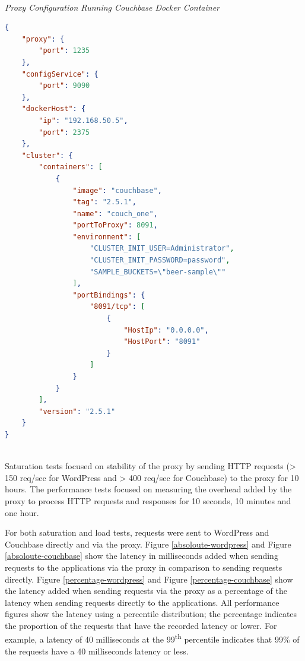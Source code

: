 \documentclass[a4paper,11pt,twoside]{report}
\begin{document}
\noindent\\
\textit{Proxy Configuration Running Couchbase Docker Container}
\begin{lstlisting}[language=json]
{
    "proxy": {
        "port": 1235
    },
    "configService": {
        "port": 9090
    },
    "dockerHost": {
        "ip": "192.168.50.5",
        "port": 2375
    },
    "cluster": {
        "containers": [
            {
                "image": "couchbase",
                "tag": "2.5.1",
                "name": "couch_one",
                "portToProxy": 8091,
                "environment": [
                    "CLUSTER_INIT_USER=Administrator",
                    "CLUSTER_INIT_PASSWORD=password",
                    "SAMPLE_BUCKETS=\"beer-sample\""
                ],
                "portBindings": {
                    "8091/tcp": [
                        {
                            "HostIp": "0.0.0.0",
                            "HostPort": "8091"
                        }
                    ]
                }
            }
        ],
        "version": "2.5.1"
    }
}
\end{lstlisting}

\noindent\\
Saturation tests focused on stability of the proxy by sending HTTP requests (> 150 req/sec for WordPress and > 400 req/sec for Couchbase) to the proxy for 10 hours. The performance tests focused on measuring the overhead added by the proxy to process HTTP requests and responses for 10 seconds, 10 minutes and one hour. 

For both saturation and load tests, requests were sent to WordPress and Couchbase directly and via the proxy. Figure \ref{absoloute-wordpress} and Figure \ref{absoloute-couchbase} show the latency in milliseconds added when sending requests to the applications via the proxy in comparison to sending requests directly.  Figure \ref{percentage-wordpress} and Figure \ref{percentage-couchbase} show the latency added when sending requests via the proxy as a percentage of the latency when sending requests directly to the applications. All performance figures show the latency using a percentile distribution; the percentage indicates the proportion of the requests that have the recorded latency or lower. For example, a latency of 40 milliseconds at the 99\textsuperscript{th} percentile indicates that 99\% of the requests have a 40 milliseconds latency or less.   
\end{document}
